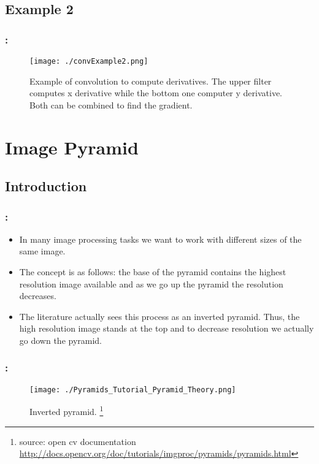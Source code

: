 \documentclass{beamer}
\begin{document}
\subsection{Example 2}
\begin{frame}
  \frametitle{\secname : \subsecname}
  \begin{figure}
    \centering
    \texttt{[image: ./convExample2.png]}
    \caption{Example of convolution to compute derivatives. The upper filter computes x derivative while the bottom one
    computer y derivative. Both can be combined to find the gradient.}
    \label{fig:pyr}
  \end{figure}
\end{frame}
\section{Image Pyramid}

\subsection{Introduction}
\begin{frame}
  \frametitle{\secname : \subsecname}
  \begin{itemize}
      \item In many image processing tasks we want to work with different sizes of the same image. 
      \item The concept is as follows: the base of the pyramid contains the highest resolution image available and as
        we go up the pyramid the resolution decreases.
      \item The literature actually sees this process as an inverted pyramid. Thus, the high
        resolution image stands at the top and to decrease resolution we actually go down the pyramid.
    \end{itemize}
\end{frame}

\begin{frame}
  \frametitle{\secname : \subsecname}
  \begin{figure}
    \centering
    \texttt{[image: ./Pyramids\_Tutorial\_Pyramid\_Theory.png]}
    \caption{Inverted pyramid. \footnote{source: open cv documentation
    \url{http://docs.opencv.org/doc/tutorials/imgproc/pyramids/pyramids.html}}}
    \label{fig:pyr}
  \end{figure}
\end{frame}
\end{document}
